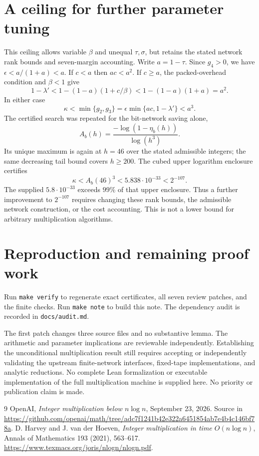 \documentclass[11pt]{article}
\begin{document}
\section{A ceiling for further parameter tuning}
This ceiling allows variable $\beta$ and unequal $\tau,\sigma$, but retains
the stated network rank bounds and seven-margin accounting.
Write $a=1-\tau$. Since $g_4>0$, we have $\epsilon<a/(1+a)<a$.
If $c<a$ then $ac<a^2$. If $c\ge a$, the packed-overhead condition and
$\beta<1$ give
\[
 1-\lambda'<1-(1-a)(1+c/\beta)
 <1-(1-a)(1+a)=a^2.
\]
In either case
\[
 \kappa<\min\{g_2,g_3\}
 =\epsilon\min\{ac,1-\lambda'\}<a^3.
\]
The certified search was repeated for the bit-network saving alone,
\[
 A_b(h)=\frac{-\log(1-\eta_b(h))}{\log(h^3)}.
\]
Its unique maximum is again at $h=46$ over the stated admissible integers;
the same decreasing tail bound covers $h\ge200$. The cubed upper
logarithm enclosure certifies
\[
 \kappa<A_b(46)^3<5.838\cdot10^{-33}<2^{-107}.
\]
The supplied $5.8\cdot10^{-33}$ exceeds $99\%$ of that upper enclosure.
Thus a further improvement to $2^{-107}$ requires changing these rank
bounds, the admissible network construction, or the cost accounting.
This is not a lower bound for arbitrary multiplication algorithms.

\section{Reproduction and remaining proof work}
Run \texttt{make verify} to regenerate exact certificates, all seven review
patches, and the finite checks. Run \texttt{make note} to build this note.
The dependency audit is recorded in \texttt{docs/audit.md}.

The first patch changes three source files and no substantive lemma.
The arithmetic and parameter implications are reviewable independently.
Establishing the unconditional multiplication result still requires accepting
or independently validating the upstream finite-network interfaces,
fixed-tape implementations, and analytic reductions. No complete Lean
formalization or executable implementation of the full multiplication
machine is supplied here. No priority or publication claim is made.

\begin{thebibliography}{9}
 OpenAI, \emph{Integer multiplication below $n\log n$},
September 23, 2026. Source in
\url{https://github.com/openai/math/tree/adc7f1241b42e322a6451854ab7e4b4c146bf78a}.
 D. Harvey and J. van der Hoeven,
\emph{Integer multiplication in time $O(n\log n)$},
Annals of Mathematics 193 (2021), 563--617.
\url{https://www.texmacs.org/joris/nlogn/nlogn.pdf}.
\end{thebibliography}
\end{document}
